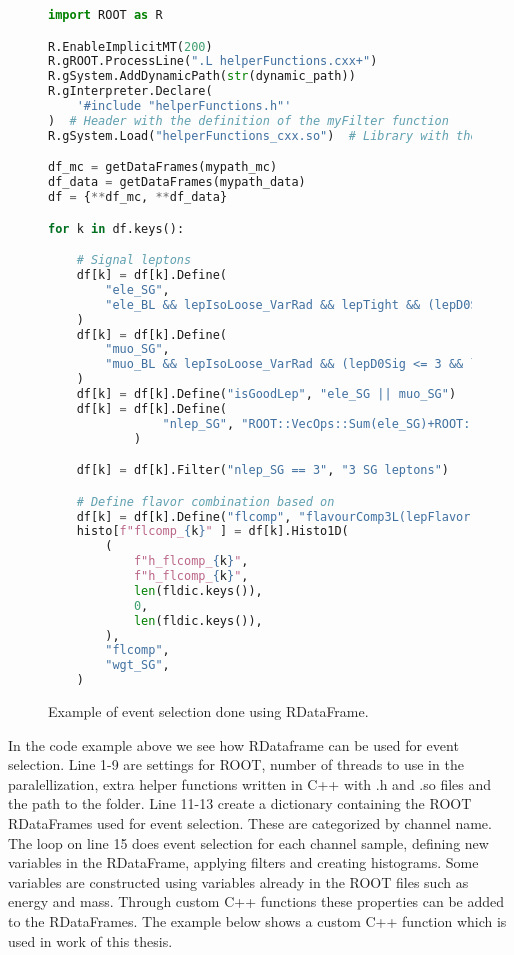\begin{figure}[H]
    \centering
\begin{lstlisting}[language=Python, style=pythonstyle, label={code:python_func_example}]
import ROOT as R

R.EnableImplicitMT(200)
R.gROOT.ProcessLine(".L helperFunctions.cxx+")
R.gSystem.AddDynamicPath(str(dynamic_path))
R.gInterpreter.Declare(
    '#include "helperFunctions.h"'
)  # Header with the definition of the myFilter function
R.gSystem.Load("helperFunctions_cxx.so")  # Library with the myFilter function

df_mc = getDataFrames(mypath_mc)
df_data = getDataFrames(mypath_data)
df = {**df_mc, **df_data}

for k in df.keys():

    # Signal leptons
    df[k] = df[k].Define(
        "ele_SG",
        "ele_BL && lepIsoLoose_VarRad && lepTight && (lepD0Sig <= 5 && lepD0Sig >= -5)",
    )  
    df[k] = df[k].Define(
        "muo_SG",
        "muo_BL && lepIsoLoose_VarRad && (lepD0Sig <= 3 && lepD0Sig >= -3)",
    )  
    df[k] = df[k].Define("isGoodLep", "ele_SG || muo_SG")
    df[k] = df[k].Define(
                "nlep_SG", "ROOT::VecOps::Sum(ele_SG)+ROOT::VecOps::Sum(muo_SG)"
            )

    df[k] = df[k].Filter("nlep_SG == 3", "3 SG leptons")

    # Define flavor combination based on 
    df[k] = df[k].Define("flcomp", "flavourComp3L(lepFlavor[ele_SG || muo_SG])")
    histo[f"flcomp_{k}" ] = df[k].Histo1D(
        (
            f"h_flcomp_{k}",
            f"h_flcomp_{k}",
            len(fldic.keys()),
            0,
            len(fldic.keys()),
        ),
        "flcomp",
        "wgt_SG",
    )
    \end{lstlisting}
    \caption[RDataFrame code example]{Example of event selection done using RDataFrame.}
    \label{code:rdata}
\end{figure}
In the code example above we see how RDataframe can be used for event selection. Line 1-9 are settings for ROOT, 
number of threads to use in the paralellization, extra helper functions written in C++ with .h and .so files and the path to the folder.
Line 11-13 create a dictionary containing the ROOT RDataFrames used for event selection. These are categorized by channel name. 
The loop on line 15 does event selection for each channel sample, defining new variables in the RDataFrame, applying filters and creating histograms.
Some variables are constructed using variables already in the ROOT files such as energy and mass. Through custom C++ functions
these properties can be added to the RDataFrames. The example below shows a custom C++ function which is used in work of this thesis.

